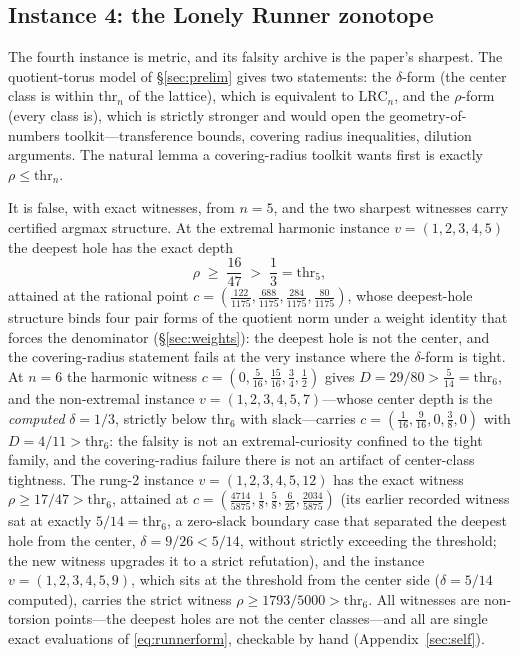 \documentclass[11pt,a4paper]{article}
\numberwithin{equation}{section}
\theoremstyle{plain}
\theoremstyle{definition}
\theoremstyle{remark}
\newcommand{\lrc}{\mathrm{LRC}}
\begin{document}
\subsection{Instance 4: the Lonely Runner zonotope}\label{sec:tm-zono}

The fourth instance is metric, and its falsity archive is the paper's
sharpest. The quotient-torus model of \S\ref{sec:prelim} gives two
statements: the $\delta$-form (the center class is within
$\mathrm{thr}_n$ of the lattice), which is equivalent to $\lrc_n$, and
the $\rho$-form (every class is), which is strictly stronger and would
open the geometry-of-numbers toolkit---transference bounds, covering
radius inequalities, dilution arguments. The natural lemma a
covering-radius toolkit wants first is exactly $\rho\le\mathrm{thr}_n$.

It is false, with exact witnesses, from $n=5$, and the two sharpest
witnesses carry certified argmax structure. At the extremal harmonic
instance $v=(1,2,3,4,5)$ the deepest hole has the exact depth
\[
\rho\;\ge\;\frac{16}{47}\;>\;\frac13=\mathrm{thr}_5,
\]
attained at the rational point
$c=(\tfrac{122}{1175},\tfrac{688}{1175},\tfrac{284}{1175},
\tfrac{80}{1175})$, whose deepest-hole structure binds four pair forms
of the quotient norm under a weight identity that forces the denominator
(\S\ref{sec:weights}): the deepest hole is not the center, and the
covering-radius statement fails at the very instance where the
$\delta$-form is tight. At $n=6$ the harmonic witness
$c=(0,\tfrac5{16},\tfrac{15}{16},\tfrac34,\tfrac12)$ gives
$D=29/80>\tfrac5{14}=\mathrm{thr}_6$, and the non-extremal instance
$v=(1,2,3,4,5,7)$---whose center depth is the \emph{computed}
$\delta=1/3$, strictly below $\mathrm{thr}_6$ with slack---carries
$c=(\tfrac1{16},\tfrac9{16},0,\tfrac38,0)$
with $D=4/11>\mathrm{thr}_6$: the falsity is not an extremal-curiosity
confined to the tight family, and the covering-radius failure there is
not an artifact of center-class tightness. The rung-2 instance
$v=(1,2,3,4,5,12)$ has the exact witness $\rho\ge17/47>\mathrm{thr}_6$,
attained at
$c=(\tfrac{4714}{5875},\tfrac18,\tfrac58,\tfrac6{25},
\tfrac{2034}{5875})$ (its earlier recorded witness sat at exactly
$5/14=\mathrm{thr}_6$, a zero-slack boundary case that separated the
deepest hole from the center, $\delta=9/26<5/14$, without strictly
exceeding the threshold; the new witness upgrades it to a strict
refutation), and the instance $v=(1,2,3,4,5,9)$, which sits at the
threshold from the center side ($\delta=5/14$ computed), carries the
strict witness $\rho\ge 1793/5000>\mathrm{thr}_6$. All witnesses are
non-torsion points---the deepest holes are
not the center classes---and all are single exact evaluations of
\eqref{eq:runnerform}, checkable by hand (Appendix~\ref{sec:self}).
\end{document}

